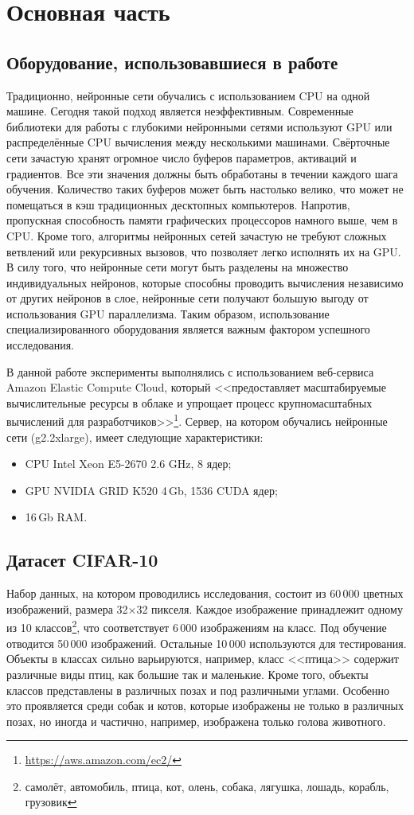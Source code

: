 \section{Основная часть}
\subsection{Оборудование, использовавшиеся в работе}
Традиционно, нейронные сети обучались с использованием CPU на одной машине. Сегодня такой подход
является неэффективным. Современные библиотеки для работы с глубокими нейронными сетями
используют GPU или распределённые CPU вычисления между несколькими машинами.
Свёрточные сети зачастую хранят огромное число буферов параметров, активаций и градиентов.
Все эти значения должны быть обработаны в течении каждого шага обучения. Количество таких буферов
может быть настолько велико, что может не помещаться в кэш традиционных десктопных компьютеров.
Напротив, пропускная способность памяти графических процессоров намного выше, чем в CPU.
Кроме того, алгоритмы нейронных сетей зачастую не требуют сложных ветвлений или рекурсивных вызовов,
что позволяет легко исполнять их на GPU. В силу того, что нейронные сети могут быть разделены на множество
индивидуальных нейронов, которые способны проводить вычисления независимо от других нейронов в слое,
нейронные сети получают большую выгоду от использования GPU параллелизма. \cite[стр. 448]{Goodfellow-et-al-2016-Book}
Таким образом, использование специализированного оборудования является важным фактором успешного исследования.

В данной работе эксперименты выполнялись с использованием веб-сервиса Amazon Elastic Compute Cloud, который
<<предоставляет масштабируемые вычислительные ресурсы в облаке и упрощает процесс крупномасштабных вычислений
для разработчиков>>\footnote{\url{https://aws.amazon.com/ec2/}}. Сервер, на котором обучались нейронные сети (g2.2xlarge),
имеет следующие характеристики:
\begin{itemize}
    \item CPU Intel Xeon E5-2670 2.6 GHz, 8 ядер;
    \item GPU NVIDIA GRID K520 4\,Gb, 1536 CUDA ядер;
    \item 16\,Gb RAM.
\end{itemize}

\subsection{Датасет CIFAR-10}
Набор данных, на котором проводились исследования, состоит из 60\,000 цветных изображений, размера 
32$\times$32 пикселя. Каждое изображение принадлежит одному из 10 классов\footnote{самолёт, автомобиль, птица,
кот, олень, собака, лягушка, лошадь, корабль, грузовик}, что соответствует 6\,000 изображениям на класс. Под 
обучение отводится 50\,000 изображений. Остальные 10\,000 используются для тестирования. Объекты в классах сильно варьируются, 
например, класс <<птица>> содержит различные виды птиц, как большие так и маленькие. Кроме того, объекты классов представлены в 
различных позах и под различными углами. Особенно это проявляется среди собак и котов, которые изображены не только в различных 
позах, но иногда и частично, например, изображена только голова животного.

